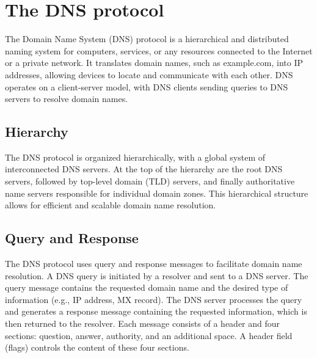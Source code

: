 \section{The DNS protocol}
The Domain Name System (DNS) protocol is a hierarchical and distributed naming system for computers, services, or any resources connected to the Internet or a private network. It translates domain names, such as example.com, into IP addresses, allowing devices to locate and communicate with each other. DNS operates on a client-server model, with DNS clients sending queries to DNS servers to resolve domain names.

\subsection{Hierarchy}
The DNS protocol is organized hierarchically, with a global system of interconnected DNS servers. At the top of the hierarchy are the root DNS servers, followed by top-level domain (TLD) servers, and finally authoritative name servers responsible for individual domain zones. This hierarchical structure allows for efficient and scalable domain name resolution.


\subsection{Query and Response}
The DNS protocol uses query and response messages to facilitate domain name resolution. A DNS query is initiated by a resolver and sent to a DNS server. The query message contains the requested domain name and the desired type of information (e.g., IP address, MX record). The DNS server processes the query and generates a response message containing the requested information, which is then returned to the resolver.
Each message consists of a header and four sections: question, answer, authority, and an additional space. A header field (flags) controls the content of these four sections.

